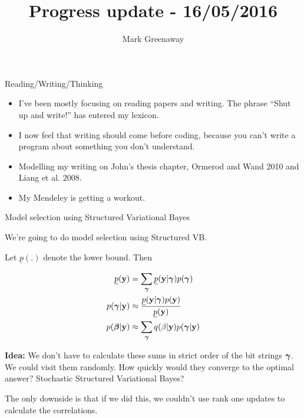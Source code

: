 \documentclass{beamer}
\title{Progress update - 16/05/2016}
\author{Mark Greenaway}
\begin{document}
\begin{frame}
\titlepage
\end{frame}

\begin{frame}{Reading/Writing/Thinking}
\begin{itemize}
\item I've been mostly focusing on reading papers and writing. The phrase ``Shut up and write!''
			has entered my lexicon.
\item I now feel that writing should come before coding, because you can't write a program about something you 
			don't	understand.
\item Modelling my writing on John's thesis chapter, Ormerod and Wand 2010 and Liang et al. 2008.
\item My Mendeley is getting a workout.
\end{itemize}

\end{frame}

\begin{frame}{Model selection using Structured Variational Bayes}

We're going to do model selection using Structured VB.

Let $\underline{p}(.)$ denote the lower bound. Then

\begin{align*}
\underline{p}({\bf y}) &= \sum_{\boldsymbol \gamma} \underline{p}({\bf y}|{\boldsymbol \gamma}) p({\boldsymbol \gamma}) \\
p({\boldsymbol \gamma}|{\bf y}) &\approx \frac{\underline{p}({\bf y} | {\boldsymbol \gamma}) p({\bf y})}{\underline{p}({\bf y})} \\
p({\boldsymbol \beta}|{\bf y}) &\approx \sum_{{\boldsymbol \gamma}} q(\beta | {\bf y}) p({\boldsymbol \gamma} | {\bf y}) \\
\end{align*}

\textbf{Idea:} We don't have to calculate these sums in strict order of the bit strings ${\boldsymbol \gamma}$. We could
visit them randomly. How quickly would they converge to the optimal answer? Stochastic Structured Variational
Bayes?

The only downside is that if we did this, we couldn't use rank one updates to calculate the correlations.

\end{frame}
\end{document}
